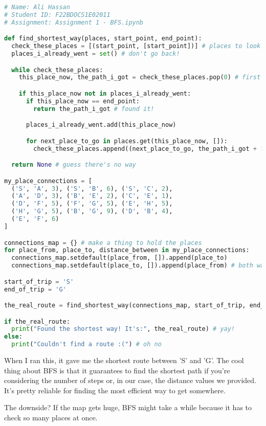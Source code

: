 \documentclass{article}
\begin{document}
\begin{lstlisting}[language=Python, basicstyle=\footnotesize\ttfamily]
# Name: Ali Hassan
# Student ID: F22BDOCS1E02011
# Assignment: Assignment 1 - BFS.ipynb

def find_shortest_way(places, start_point, end_point):
  check_these_places = [(start_point, [start_point])] # places to look at later
  places_i_already_went = set() # don't go back!

  while check_these_places:
    this_place_now, the_path_i_got = check_these_places.pop(0) # first one in, first one out?

    if this_place_now not in places_i_already_went:
      if this_place_now == end_point:
        return the_path_i_got # found it!

      places_i_already_went.add(this_place_now)

      for next_place_to_go in places.get(this_place_now, []):
        check_these_places.append((next_place_to_go, the_path_i_got + [next_place_to_go])) # add to the list

  return None # guess there's no way

my_place_connections = [
  ('S', 'A', 3), ('S', 'B', 6), ('S', 'C', 2),
  ('A', 'D', 3), ('B', 'E', 2), ('C', 'E', 1),
  ('D', 'F', 5), ('F', 'G', 5), ('E', 'H', 5),
  ('H', 'G', 5), ('B', 'G', 9), ('D', 'B', 4),
  ('E', 'F', 6)
]

connections_map = {} # make a thing to hold the places
for place_from, place_to, distance_between in my_place_connections:
  connections_map.setdefault(place_from, []).append(place_to)
  connections_map.setdefault(place_to, []).append(place_from) # both ways!

start_of_trip = 'S'
end_of_trip = 'G'

the_real_route = find_shortest_way(connections_map, start_of_trip, end_of_trip)

if the_real_route:
  print("Found the shortest way! It's:", the_real_route) # yay!
else:
  print("Couldn't find a route :(") # oh no
\end{lstlisting}

When I ran this, it gave me the shortest route between 'S' and 'G'. The cool thing about BFS is that it guarantees to find the shortest path if you're considering the number of steps or, in our case, the distance values we provided. It's pretty reliable for finding the most efficient way to get somewhere.

The downside? If the map gets huge, BFS might take a while because it has to check so many places at once.
\end{document}
